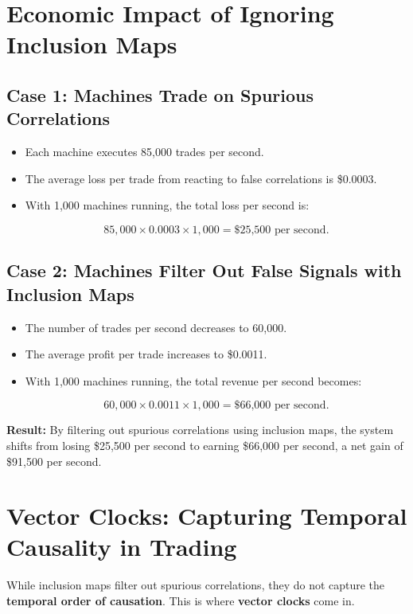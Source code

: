 \section{Economic Impact of Ignoring Inclusion Maps}

\subsection{Case 1: Machines Trade on Spurious Correlations}

\begin{itemize}
    \item Each machine executes 85,000 trades per second.
    \item The average loss per trade from reacting to false correlations is \$0.0003.
    \item With 1,000 machines running, the total loss per second is:

    \[
    85,000 \times 0.0003 \times 1,000 = \text{\$25,500 per second}.
    \]

\end{itemize}

\subsection{Case 2: Machines Filter Out False Signals with Inclusion Maps}

\begin{itemize}
    \item The number of trades per second decreases to 60,000.
    \item The average profit per trade increases to \$0.0011.
    \item With 1,000 machines running, the total revenue per second becomes:

    \[
    60,000 \times 0.0011 \times 1,000 = \text{\$66,000 per second}.
    \]

\end{itemize}

\textbf{Result:} By filtering out spurious correlations using inclusion maps, the system shifts from losing \$25,500 per second to earning \$66,000 per second, a net gain of \$91,500 per second.

\section{Vector Clocks: Capturing Temporal Causality in Trading}

While inclusion maps filter out spurious correlations, they do not capture the \textbf{temporal order of causation}. This is where \textbf{vector clocks} come in.

